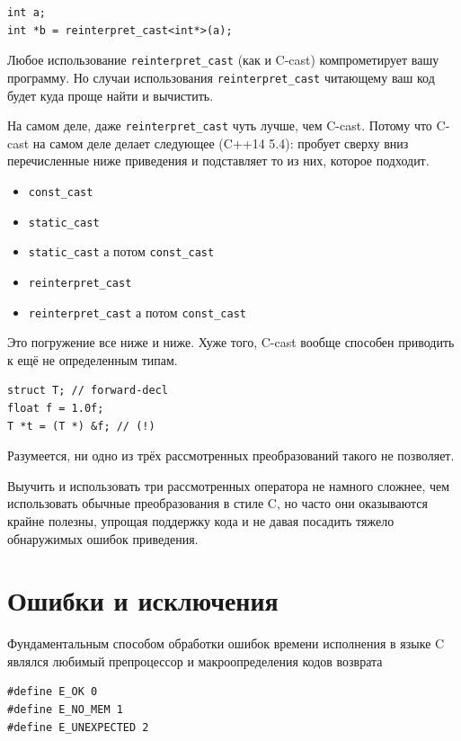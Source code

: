 \documentclass[a4paper,12pt,oneside]{book}
\begin{document}
\begin{lstlisting}
int a;
int *b = reinterpret_cast<int*>(a);
\end{lstlisting}

Любое использование \lstinline!reinterpret_cast! (как и C-cast) компрометирует вашу программу. Но случаи использования \lstinline!reinterpret_cast! читающему ваш код будет куда проще найти и вычистить.

На самом деле, даже \lstinline!reinterpret_cast! чуть лучше, чем C-cast. Потому что C-cast на самом деле делает следующее (C++14 5.4): пробует сверху вниз перечисленные ниже приведения и подставляет то из них, которое подходит.

\begin{itemize}
\item \lstinline!const_cast!
\item \lstinline!static_cast!
\item \lstinline!static_cast! а потом \lstinline!const_cast!
\item \lstinline!reinterpret_cast!
\item \lstinline!reinterpret_cast! а потом \lstinline!const_cast!
\end{itemize}

Это погружение все ниже и ниже. Хуже того, C-cast вообще способен приводить к ещё не определенным типам.

\begin{lstlisting}
struct T; // forward-decl
float f = 1.0f;
T *t = (T *) &f; // (!)
\end{lstlisting}

Разумеется, ни одно из трёх рассмотренных преобразований такого не позволяет.

Выучить и использовать три рассмотренных оператора не намного сложнее, чем использовать обычные преобразования в стиле C, но часто они оказываются крайне полезны, упрощая поддержку кода и не давая посадить тяжело обнаружимых ошибок приведения.

\pagebreak
\section{Ошибки и исключения}\label{subsec:basicexceptions}

Фундаментальным способом обработки ошибок времени исполнения в языке C являлся любимый препроцессор и макроопределения кодов возврата

\begin{lstlisting}
#define E_OK 0
#define E_NO_MEM 1
#define E_UNEXPECTED 2
\end{lstlisting}
\end{document}
